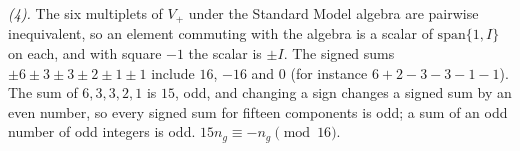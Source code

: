 \emph{(4).} The six multiplets of $V_{+}$ under the Standard Model algebra are pairwise inequivalent, so an element commuting with the algebra is a scalar of $\mathrm{span}\{1, I\}$ on each, and with square $-1$ the scalar is $\pm I$. The signed sums $\pm 6 \pm 3 \pm 3 \pm 2 \pm 1 \pm 1$ include $16$, $-16$ and $0$ (for instance $6 + 2 - 3 - 3 - 1 - 1$). The sum of $6, 3, 3, 2, 1$ is $15$, odd, and changing a sign changes a signed sum by an even number, so every signed sum for fifteen components is odd; a sum of an odd number of odd integers is odd. $15n_{g} \equiv -n_{g} \pmod{16}$.
